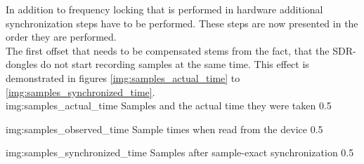 In addition to frequency locking that is performed in
hardware additional synchronization steps have to
be performed. These steps are now presented in the
order they are performed. \\

The first offset that needs to be compensated stems
from the fact, that the SDR-dongles do not start
recording samples at the same time.
This effect is demonstrated in figures
\ref{img:samples_actual_time} to \ref{img:samples_synchronized_time}. \\

             {img:samples_actual_time}
             {Samples and the actual time they were taken}
             {0.5}

             {img:samples_observed_time}
             {Sample times when read from the device}
             {0.5}

             {img:samples_synchronized_time}
             {Samples after sample-exact synchronization}
             {0.5}
